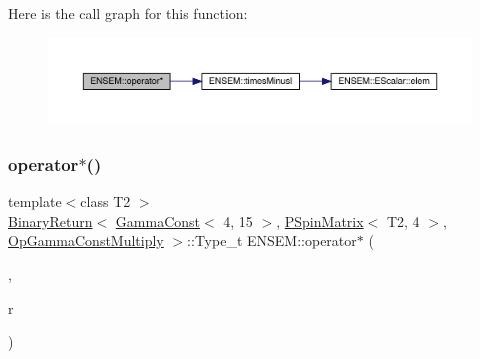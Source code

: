 Here is the call graph for this function\+:\nopagebreak
\begin{figure}[H]
\begin{center}
\leavevmode
\includegraphics[width=350pt]{d6/df5/group__primspinmatrix_ga8b0118f0d96b78f8fbea926daf66af8f_cgraph}
\end{center}
\end{figure}
\mbox{\label{group__primspinmatrix_gaf61c9e0fced9fe43e7016043fadb4e98}} 
\subsubsection{\texorpdfstring{operator$\ast$()}{operator*()}\hspace{0.1cm}{\footnotesize\ttfamily [16/64]}}
{\footnotesize\ttfamily template$<$class T2 $>$ \\
\mbox{\hyperlink{structENSEM_1_1BinaryReturn}{Binary\+Return}}$<$ \mbox{\hyperlink{classENSEM_1_1GammaConst}{Gamma\+Const}}$<$ 4, 15 $>$, \mbox{\hyperlink{classENSEM_1_1PSpinMatrix}{P\+Spin\+Matrix}}$<$ T2, 4 $>$, \mbox{\hyperlink{structENSEM_1_1OpGammaConstMultiply}{Op\+Gamma\+Const\+Multiply}} $>$\+::Type\+\_\+t E\+N\+S\+E\+M\+::operator$\ast$ (\begin{DoxyParamCaption}\item[{const \mbox{\hyperlink{classENSEM_1_1GammaConst}{Gamma\+Const}}$<$ 4, 15 $>$ \&}]{,  }\item[{const \mbox{\hyperlink{classENSEM_1_1PSpinMatrix}{P\+Spin\+Matrix}}$<$ T2, 4 $>$ \&}]{r }\end{DoxyParamCaption})\hspace{0.3cm}{\ttfamily [inline]}}

\mbox{\label{group__primspinmatrix_ga55a6793cedfea5afc1bafa2c470d0350}} 

